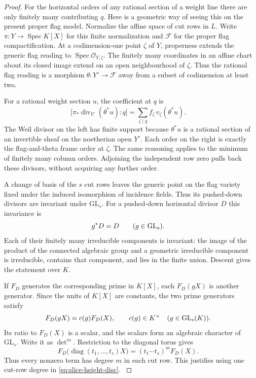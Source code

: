 \begin{proof}
For the horizontal orders of any rational section of a weight
line there are only finitely many contributing \(q\). Here
is a geometric way of seeing this on the present proper
flag model. Normalize the affine space of cut rows in \(L\).
Write \(\pi:Y\to\operatorname{Spec}K[X]\) for this finite
normalization and \(\mathcal F\) for the proper flag compactification.
At a codimension-one point \(\zeta\) of \(Y\), properness extends the
generic flag reading to \(\operatorname{Spec}\mathcal O_{Y,\zeta}\).
The finitely many coordinates in an affine chart about its closed
image extend on an open neighbourhood of \(\zeta\). Thus the rational
flag reading is a morphism \(\theta:Y^\circ\to\mathcal F\) away from
a subset of codimension at least two.

For a rational weight section
\(u\), the coefficient at \(q\) is
\[
 \bigl[\pi_*\operatorname{div}_{Y^\circ}(\theta^*u):q\bigr]
         =\sum_{\zeta\mid q} f_\zeta\,v_\zeta(\theta^*u).
\]
The Weil divisor on the left has finite support because \(\theta^*u\)
is a rational section of an invertible sheaf on the noetherian open
\(Y^\circ\). Each order on the right is exactly the flag-and-theta
frame order at \(\zeta\).
The same reasoning applies to the minimum of finitely many
column orders. Adjoining the independent row zero pulls
back these divisors, without acquiring any further order.

A change of basis of the \(s\) cut rows leaves the generic
point on the flag variety fixed under the induced isomorphism
of incidence fields. Thus its pushed-down divisors are invariant
under \(\mathrm{GL}_s\).
For a pushed-down horizontal divisor \(D\) this invariance is
\[
  g^*D=D\qquad(g\in{\rm GL}_s).
\]
 Each of their finitely many irreducible
components is invariant: the image of the product of the
connected algebraic group and a geometric irreducible component
is irreducible, contains that component, and lies in the
finite union. Descent gives the statement over \(K\).

If \(F_D\) generates the corresponding prime in \(K[X]\),
each \(F_D(gX)\) is another generator.
Since the units of \(K[X]\) are constants, the two prime generators satisfy
\[
  F_D(gX)=c(g)F_D(X),\qquad c(g)\in K^\times\quad(g\in{\rm GL}_s(K)).
\]
 Its ratio to \(F_D(X)\)
is a scalar, and the scalars form an algebraic character of
\(\mathrm{GL}_s\). Write it as \(\det^m\). Restriction to the
diagonal torus gives
\[
 F_D\bigl(\operatorname{diag}(t_1,\dots,t_s)X\bigr)
          =(t_1\cdots t_s)^m F_D(X).
\]
Thus every nonzero term has degree \(m\) in each cut row. This justifies
using one cut-row degree in \eqref{eq:slice-height-disc}.
\label{cor:slice-integrals-1}


\end{proof}
